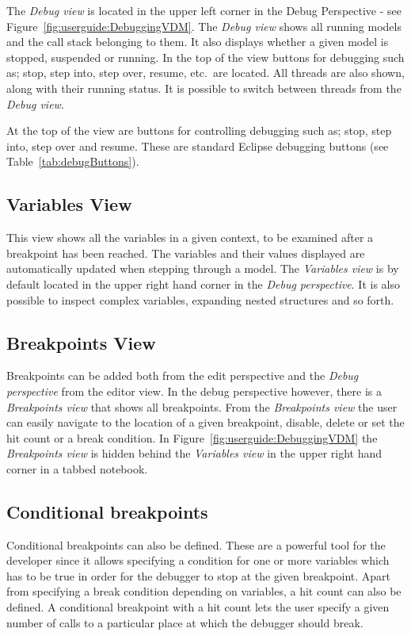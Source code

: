 \documentclass{overturerepchap}
\begin{document}
The \emph{Debug view} is located in the upper left corner in the Debug Perspective -
see Figure~\ref{fig:userguide:DebuggingVDM}. The \emph{Debug view} shows all running
models and the call stack belonging to them. It also displays whether a given model is
stopped, suspended or running. In the top of the view buttons
for debugging such as; stop, step into, step over, resume, etc.\ are located.
All threads are also shown, along with their running status. It is possible to
switch between threads from the \emph{Debug view}.

At the top of the view are buttons for controlling debugging such as; stop, step
into, step over and resume. These are standard Eclipse debugging
buttons (see Table~\ref{tab:debugButtons}).

\subsection{Variables View}
 
This view shows all the variables in a given context, to be examined after a breakpoint has been
reached. The variables and their values displayed are automatically updated when
stepping through a model. The \emph{Variables view} is by default located in the upper
right hand corner in the \emph{Debug perspective}. It is also possible to inspect complex variables,
expanding nested structures and so forth.

\subsection{Breakpoints View}

Breakpoints can be added both from the edit perspective and the \emph{Debug perspective}
from the editor view. In the debug perspective however, there is a \emph{Breakpoints
view} that shows all breakpoints. From the \emph{Breakpoints view} the user can easily
navigate to the location of a given breakpoint, disable, delete or set the hit
count or a break condition. In Figure~\ref{fig:userguide:DebuggingVDM} the
\emph{Breakpoints view} is hidden behind the \emph{Variables view} in the upper right hand 
corner in a tabbed notebook. 

\subsection{Conditional breakpoints}
\label{sec:userguide:breakpoints}

Conditional breakpoints can also be defined. These are a powerful tool for the
developer since it allows specifying a condition for one or more variables which
has to be true in order for the debugger to stop at the given breakpoint. Apart
from specifying a break condition depending on variables, a hit count can also be
defined. A conditional breakpoint with a hit count lets the user specify a given
number of calls to a particular place at which the debugger should break.
\end{document}
